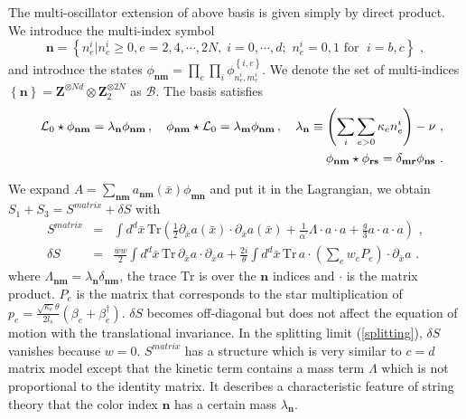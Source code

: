 \documentclass[a4paper,aps,preprint,nofootinbib,eqsecnum]{revtex4}
\begin{document}
The multi-oscillator extension of above basis is given simply by direct
product. We introduce the multi-index symbol
\begin{equation}
\mathbf{n}=\left\{ n_{e}^{i}|n_{e}^{i}\geq 0,e=2,4,\cdots ,2N,\;i=0,\cdots
,d;\,\,n_{e}^{i}=0,1\mbox{ for }\;i=b,c\right\} \,\,,
\end{equation}%
and introduce the states $\phi _{\mathbf{n}\mathbf{m}}=\prod_{e}\prod_{i}%
\phi _{n_{e}^{i},m_{e}^{i}}^{\left\{ i,e\right\} }$. We denote the set of
multi-indices $\left\{ \mathbf{n}\right\} =\mathbf{Z}^{\otimes Nd}\otimes
\mathbf{Z}_{2}^{\otimes 2N}$ as $\mathcal{B}$. The basis satisfies
\begin{eqnarray}
&&{\mathcal{L}_{0}}\star \phi _{\mathbf{n}\mathbf{m}}=\lambda _{\mathbf{n}%
}\phi _{\mathbf{n}\mathbf{m}}\,,\quad \phi _{\mathbf{n}\mathbf{m}}\star {%
\mathcal{L}_{0}}=\lambda _{\mathbf{m}}\phi _{\mathbf{n}\mathbf{m}}\,,\quad
\lambda _{\mathbf{n}}\equiv \left( \sum_{i}\sum_{e>0}\kappa
_{e}n_{e}^{i}\right) -\nu \,\,, \\
&&\phi _{\mathbf{n}\mathbf{m}}\star \phi _{\mathbf{r}\mathbf{s}}=\delta _{%
\mathbf{mr}}\phi _{\mathbf{n}\mathbf{s}}\,\,.
\end{eqnarray}

We expand $A=\sum_{\mathbf{nm}}a_{\mathbf{nm}}(\bar{x})\phi _{\mathbf{mn}}$
and put it in the Lagrangian, we obtain $S_{1}+S_{3}=S^{matrix}+\delta S$
with %
\begin{eqnarray}
S^{matrix} &=&\int d^{d}\bar{x}\,\mbox{Tr}\left( \frac{1}{2}\partial _{\bar{x%
}}a(\bar{x})\cdot \partial _{\bar{x}}a(\bar{x})+\frac{1}{{\alpha ^{\prime }}}%
\Lambda \cdot a\cdot a+\frac{g}{3}a\cdot a\cdot a\right) \,\,,
\label{matrix_model} \\
\delta S &=&\frac{\bar{w}w}{2}\int d^{d}\bar{x}\,\mbox{Tr}\,\partial _{\bar{x%
}}a\cdot \partial _{\bar{x}}a+\frac{2i}{\theta }\int d^{d}\bar{x}\,\mbox{Tr}%
\,a\cdot (\sum_{e}w_{e}P_{e})\cdot \partial _{\bar{x}}a\,\,.
\label{matrix_corr}
\end{eqnarray}%
where $\Lambda _{\mathbf{nm}}=\lambda _{\mathbf{n}}\delta _{\mathbf{nm}}$,
the trace $\mbox{Tr}$ is over the $\mathbf{n}$ indices and $\cdot $ is the
matrix product. $P_{e}$ is the matrix that corresponds to the star
multiplication of $p_{e}=\frac{\sqrt{\kappa _{e}}\theta }{2l_{s}}(\beta
_{e}+\beta _{e}^{\dagger })$. $\delta S$ becomes off-diagonal but does not
affect the equation of motion with the translational invariance. In the
splitting limit (\ref{splitting}), $\delta S$ vanishes because $w=0$. $%
S^{matrix}$ has a structure which is very similar to $c=d$ matrix model
except that the kinetic term contains a mass term $\Lambda $ which is not
proportional to the identity matrix. It describes a characteristic feature
of string theory that the color index $\mathbf{n}$ has a certain mass $%
\lambda _{\mathbf{n}}$.
\end{document}
